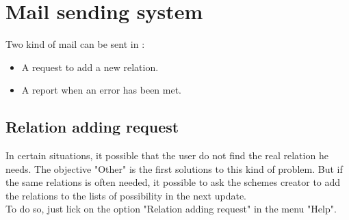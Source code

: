 
\chapter{Mail sending system}

Two kind of mail can be sent in \tria :
\begin{itemize}
\item A request to add a new relation.\\
\item A report when an error has been met.\\
\end{itemize}

\section{Relation adding request}
In certain situations, it possible that the user do not find the real relation he needs. The objective "Other" is the first solutions to this kind of problem. But if the same relations is often needed, it possible to ask the schemes creator to add the relations to the lists of possibility in the next update.\\

To do so, just lick on the option "Relation adding request" in the menu "Help".\\





